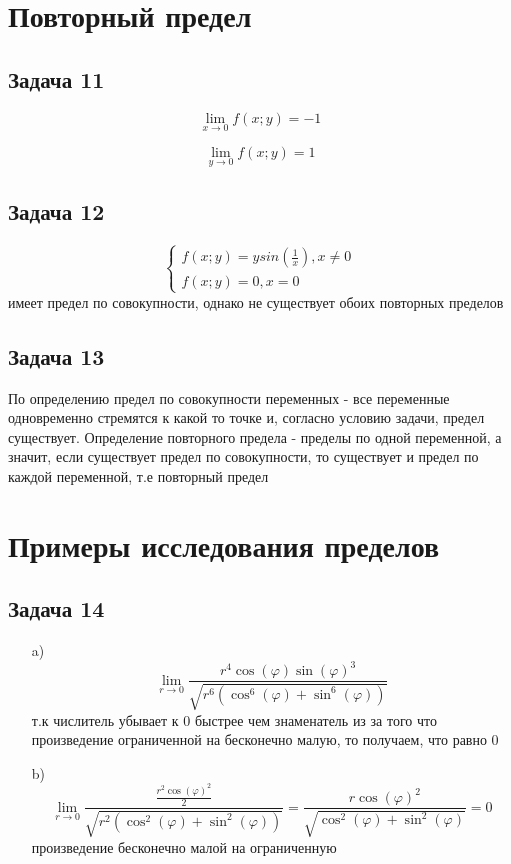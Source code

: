 \documentclass[a4paper,12pt]{article}
\begin{document}
\section{Повторный предел}

\subsection{Задача 11}
\[
\lim_{x \to 0} f(x;y) = -1
\]

\[
\lim_{y \to 0} f(x;y) = 1
\]

\subsection{Задача 12}
\[
\begin{cases}
    f(x;y) = ysin(\frac{1}{x}), x \ne 0 \\
    f(x;y) = 0, x = 0
\end{cases}
\]
имеет предел по совокупности, однако не существует обоих повторных пределов

\subsection{Задача 13} 
По определению предел по совокупности переменных - все переменные одновременно стремятся к какой то точке и, согласно условию задачи, предел существует.
Определение повторного предела - пределы по одной переменной, а значит, если существует предел по совокупности, то существует и предел по каждой переменной, т.е повторный предел

\section{Примеры исследования пределов}

\subsection{Задача 14}

\begin{enumerate}
    \item[a)]   \[
                \lim_{r \to 0} \frac{r^4\cos(\varphi)\sin(\varphi)^3}{\sqrt{r^6(\cos^6(\varphi)+\sin^6(\varphi))}}
                \]
                т.к числитель убывает к 0 быстрее чем знаменатель из за того что произведение ограниченной на бесконечно малую, то получаем, что равно 0
    \item[b)]   \[
                \lim_{r \to 0} \frac{\frac{r^2\cos(\varphi)^2}{2}}{\sqrt{r^2(\cos^2(\varphi)+\sin^2(\varphi))}}=\frac{r\cos(\varphi)^2}{\sqrt{\cos^2(\varphi)+\sin^2(\varphi)}} = 0
                \]
                произведение бесконечно малой на ограниченную
\end{enumerate}
\end{document}
